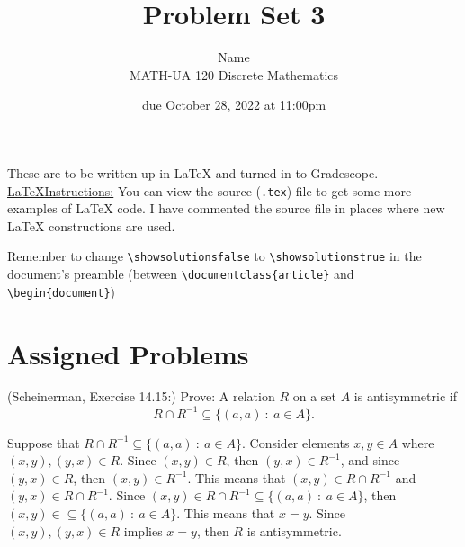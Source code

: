\documentclass{article}
\title{Problem Set 3}
\author{%
    Name
\\  MATH-UA 120 Discrete Mathematics
}
\date{due October 28, 2022 at 11:00pm}
\newif\ifshowsolutions
\newcommand{\danger}{\marginpar[\hfill\dbend]{\dbend\hfill}}
\theoremstyle{definition}
\begin{document}
\maketitle



These are to be written up in \LaTeX{} and turned in to Gradescope.\\



\ifshowsolutions
    \SetupExSheets{solution/print=true}
\else
    \danger
 \underline{ \LaTeX  Instructions:}  You can view the source (\texttt{.tex}) file to get some more examples of \LaTeX{} code.  I have commented the source file in places where new \LaTeX{} constructions are used.
  
  Remember to change \verb|\showsolutionsfalse| to \verb|\showsolutionstrue|
    in the document's preamble 
    (between \verb|\documentclass{article}| and \verb|\begin{document}|)
\fi

\section*{Assigned Problems}

\begin{question}
    (Scheinerman, Exercise 14.15:)
    Prove: A relation $R$ on a set $A$ is antisymmetric if 
    \[ R \cap R^{-1} \subseteq \{ (a, a) ~:~ a \in A \}. \]
\end{question}
\begin{solution}
Suppose that $R \cap R^{-1} \subseteq \{ (a, a) ~:~ a \in A \}$. Consider elements $x, y\in A$ where $(x, y), (y, x) \in R$. Since $(x, y) \in R$, then $(y, x) \in R^{-1}$, and since $(y, x) \in R$, then $(x, y) \in R^{-1}$. This means that $(x, y) \in R\cap R^{-1}$ and $(y, x) \in R\cap R^{-1}$. Since $(x, y) \in R \cap R^{-1}\subseteq \{ (a, a) ~:~ a \in A \}$, then $(x, y) \in \subseteq \{ (a, a) ~:~ a \in A \}$.  This means that $x = y$. Since $(x, y), (y, x) \in R$ implies $x= y$, then $R$ is antisymmetric.
\end{solution}
\end{document}
